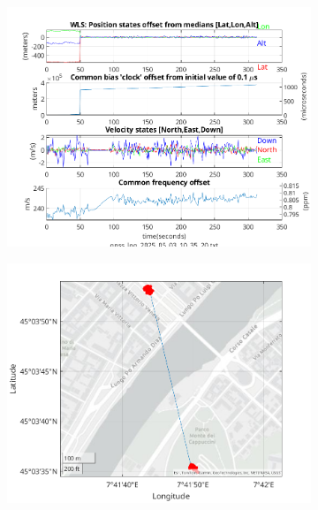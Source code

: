                 \begin{figure}[h!]
            \centering
            \begin{subfigure}{0.23\textwidth}
                \includegraphics[width=\textwidth]{images/tests/Monte_Cappuccini/Spoofing/task6_figures/Samsung_A51_Monte_Cappuccini_fig5.png}
                \caption{}
            \end{subfigure}
            \hfill
            \begin{subfigure}{0.23\textwidth}
                \includegraphics[width=\textwidth]{images/tests/Monte_Cappuccini/Spoofing/task6_figures/Samsung_A51_Monte_Cappuccini_fig6.png}
                \caption{}
            \end{subfigure}
        \end{figure}

